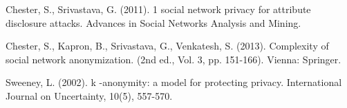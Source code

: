 

\begin{thebibliography}{19}

{\footnotesize 


  Chester, S.,  Srivastava, G. (2011). 1 social network privacy for attribute disclosure attacks. Advances in Social Networks Analysis and Mining.

 Chester, S., Kapron, B., Srivastava, G., Venkatesh, S. (2013). Complexity of social network anonymization. (2nd ed., Vol. 3, pp. 151-166). Vienna: Springer.

 Sweeney, L. (2002). k -anonymity: a model for protecting privacy. International Journal on Uncertainty, 10(5), 557-570. 

}

\end{thebibliography}